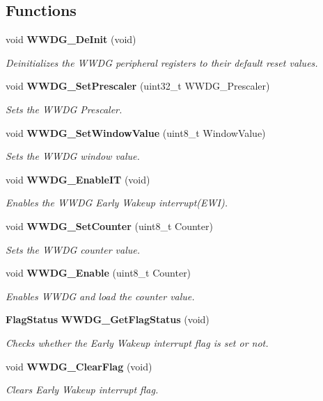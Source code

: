 \subsection*{Functions}
\begin{DoxyCompactItemize}
\item 
void \textbf{ W\+W\+D\+G\+\_\+\+De\+Init} (void)
\begin{DoxyCompactList}\small\item\em Deinitializes the W\+W\+DG peripheral registers to their default reset values. \end{DoxyCompactList}\item 
void \textbf{ W\+W\+D\+G\+\_\+\+Set\+Prescaler} (uint32\+\_\+t W\+W\+D\+G\+\_\+\+Prescaler)
\begin{DoxyCompactList}\small\item\em Sets the W\+W\+DG Prescaler. \end{DoxyCompactList}\item 
void \textbf{ W\+W\+D\+G\+\_\+\+Set\+Window\+Value} (uint8\+\_\+t Window\+Value)
\begin{DoxyCompactList}\small\item\em Sets the W\+W\+DG window value. \end{DoxyCompactList}\item 
void \textbf{ W\+W\+D\+G\+\_\+\+Enable\+IT} (void)
\begin{DoxyCompactList}\small\item\em Enables the W\+W\+DG Early Wakeup interrupt(\+E\+W\+I). \end{DoxyCompactList}\item 
void \textbf{ W\+W\+D\+G\+\_\+\+Set\+Counter} (uint8\+\_\+t Counter)
\begin{DoxyCompactList}\small\item\em Sets the W\+W\+DG counter value. \end{DoxyCompactList}\item 
void \textbf{ W\+W\+D\+G\+\_\+\+Enable} (uint8\+\_\+t Counter)
\begin{DoxyCompactList}\small\item\em Enables W\+W\+DG and load the counter value. \end{DoxyCompactList}\item 
\textbf{ Flag\+Status} \textbf{ W\+W\+D\+G\+\_\+\+Get\+Flag\+Status} (void)
\begin{DoxyCompactList}\small\item\em Checks whether the Early Wakeup interrupt flag is set or not. \end{DoxyCompactList}\item 
void \textbf{ W\+W\+D\+G\+\_\+\+Clear\+Flag} (void)
\begin{DoxyCompactList}\small\item\em Clears Early Wakeup interrupt flag. \end{DoxyCompactList}\end{DoxyCompactItemize}


